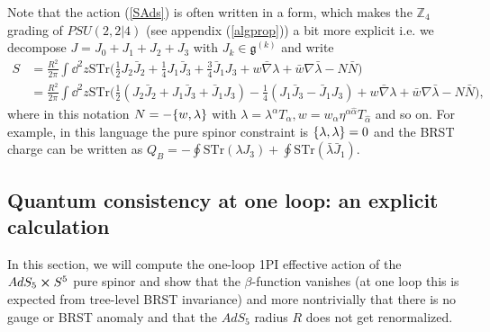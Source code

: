 \documentclass[12pt]{article}
\def\be{\begin{equation}}
\def\ee{\end{equation}}
\numberwithin{equation}{section}
\newcommand{\h}[1]{\hat{#1}}
\begin{document}
Note that the action (\ref{SAds}) is often written in a form, which makes the $\mathbb{Z}_4$ grading of $PSU(2,2|4)$ (see appendix (\ref{algprop})) a bit more explicit i.e. we decompose $J = J_0 + J_1 + J_2 + J_3$ with $J_k \in \mathfrak{g}^{(k)}$ and write
\be
\begin{aligned}
	S &= \frac{R^2}{2\pi} \int \dd^2z \text{STr}\big(\frac{1}{2} J_2 \bar{J}_2 + \frac{1}{4} J_1 \bar{J}_3 + \frac{3}{4} \bar{J}_1 J_3  + w \bar{\nabla} \lambda + \bar{w} \nabla \bar{\lambda} - N \bar{N}\big) \\
	  &= \frac{R^2}{2\pi} \int \dd^2 z \text{STr}\big(\frac{1}{2} (J_2 \bar{J}_2 + J_1 \bar{J}_3 + \bar{J}_1 J_3) - \frac{1}{4}(J_1 \bar{J}_3 - \bar{J}_1 J_3 ) + w\bar{\nabla} \lambda + \bar{w} \nabla \bar{\lambda} - N \bar{N}\big),
	  \label{Sind}
\end{aligned}
\ee
where in this notation $N = -\acomm{w}{\lambda}$ with $\lambda = \lambda^\alpha T_\alpha, w = w_\alpha \eta^{\alpha \h{\alpha}} T_{\h{\alpha}}$ and so on. For example, in this language the pure spinor constraint is $\acomm{\lambda}{\lambda} = 0$ and the BRST charge can be written as $Q_B = -\oint \text{STr} (\lambda J_3) + \oint \text{STr} (\bar{\lambda} \bar{J}_1)$.



\subsection{Quantum consistency at one loop: an explicit calculation}
\label{fourtwo}
In this section, we will compute the one-loop 1PI effective action of the $AdS_5 \cross S^5$ pure spinor and show that the $\beta$-function vanishes (at one loop this is expected from tree-level BRST invariance) and more nontrivially that there is no gauge or BRST anomaly and that the $AdS_5$ radius $R$ does not get renormalized.
\end{document}
